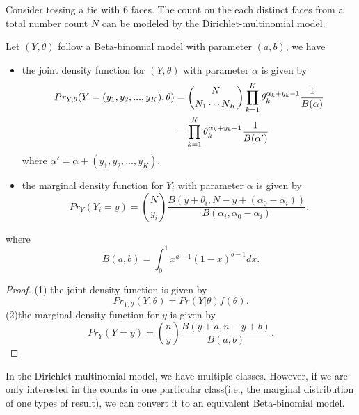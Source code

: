 \begin{refsection}
\begin{example}
Consider tossing a tie with 6 faces. The count on the each distinct faces from a total number count $N$ can be modeled by the Dirichlet-multinomial model.	
\end{example}

\begin{lemma}
	Let $(Y,\theta)$ follow  a Beta-binomial model with parameter $(a,b)$, we have
	\begin{itemize}
		\item the joint density function  for $(Y,\theta)$ with parameter $\alpha$ is given by
		\begin{align*}
		Pr_{Y, \theta}(Y = (y_1,y_2,...,y_K), \theta) &= \dbinom{N}{N_1\cdots N_K}\prod_{k=1}^K \theta_k^{\alpha_k+y_k-1} \frac{1}{B(\alpha)}\\
		&=\prod_{k=1}^K \theta_k^{\alpha_k+y_k-1} \frac{1}{B(\alpha')}
		\end{align*}
		where $\alpha'=\alpha+(y_1,y_2,...,y_K).$
		\item the marginal density function for $Y_i$ with parameter $\alpha$ is given by
		$$Pr_Y(Y_i=y)=\binom{N}{y_i} \frac{B(y+\theta_i,N-y+(\alpha_0-\alpha_i))}{B(\alpha_i,\alpha_0-\alpha_i)}.$$
	\end{itemize}	
	where $$B(a,b) = \int_0^1 x^{a-1}(1-x)^{b-1} dx.$$
\end{lemma}
\begin{proof}
	(1) the joint density function is given by
	$$Pr_{Y, \theta}(Y,\theta) = Pr(Y|\theta)f(\theta).$$
	(2)the marginal density function for $y$ is given by
	$$Pr_Y(Y=y)=\binom{n}{y} \frac{B(y+a,n-y+b)}{B(a,b)}.$$	
\end{proof}


\begin{remark}
In the Dirichlet-multinomial model, we have multiple classes. However, if we are only interested in the counts in one particular class(i.e., the marginal distribution of one types of result), we can convert it to an equivalent Beta-binomial model. 	
\end{remark}



\end{refsection}
